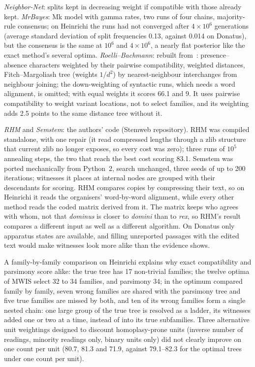 \documentclass[11pt,a4paper]{article}
\theoremstyle{remark}
\begin{document}
\emph{Neighbor-Net}: splits kept in decreasing weight if compatible with those already kept. \emph{MrBayes}: Mk model with gamma rates, two runs of four chains, majority-rule consensus; on Heinrichi the runs had not converged after $4\times10^6$ generations (average standard deviation of split frequencies 0.13, against 0.014 on Donatus), but the consensus is the same at $10^6$ and $4\times10^6$, a nearly flat posterior like the exact method's several optima. \emph{Roelli--Bachmann}: rebuilt from~\citet{RoelliBachmann2010}\citep[pp.~326, 345]{Roelli2020}: presence--absence characters weighted by their pairwise compatibility, weighted distances, Fitch--Margoliash tree (weights $1/d^2$) by nearest-neighbour interchanges from neighbour joining; the down-weighting of syntactic runs, which needs a word alignment, is omitted; with equal weights it scores 66.1 and 9. It uses pairwise compatibility to weight variant locations, not to select families, and its weighting adds 2.5 points to the same distance tree without it.

\emph{RHM} and \emph{Semstem}: the authors' code (Stemweb repository). RHM was compiled standalone, with one repair (it read compressed lengths through a zlib structure that current zlib no longer exposes, so every cost was zero); three runs of $10^5$ annealing steps, the two that reach the best cost scoring 83.1. Semstem was ported mechanically from Python~2, search unchanged, three seeds of up to 200 iterations; witnesses it places at internal nodes are grouped with their descendants for scoring. RHM compares copies by compressing their text, so on Heinrichi it reads the organisers' word-by-word alignment, while every other method reads the coded matrix derived from it. The matrix keeps who agrees with whom, not that \emph{dominus} is closer to \emph{domini} than to \emph{rex}, so RHM's result compares a different input as well as a different algorithm. On Donatus only apparatus states are available, and filling unreported passages with the edited text would make witnesses look more alike than the evidence shows.

A family-by-family comparison on Heinrichi explains why exact compatibility and parsimony score alike: the true tree has 17 non-trivial families; the twelve optima of MWIS select 32 to 34 families, and parsimony 34; in the optimum compared family by family, seven wrong families are shared with the parsimony tree and five true families are missed by both, and ten of its wrong families form a single nested chain: one large group of the true tree is resolved as a ladder, its witnesses added one or two at a time, instead of into its true subfamilies. Three alternative unit weightings designed to discount homoplasy-prone units (inverse number of readings, minority readings only, binary units only) did not clearly improve on one count per unit (80.7, 81.3 and 71.9, against 79.1--82.3 for the optimal trees under one count per unit).
\end{document}
